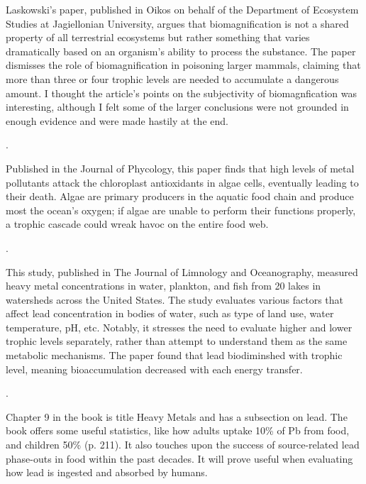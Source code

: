 \documentclass{article}
\begin{document}
Laskowski’s paper, published in Oikos on behalf of the Department of Ecosystem Studies at Jagiellonian University, argues that biomagnification is not a shared property of all terrestrial ecosystems but rather something that varies dramatically based on an organism’s ability to process the substance.  The paper dismisses the role of biomagnification in poisoning larger mammals, claiming that more than three or four trophic levels are needed to accumulate a dangerous amount. I thought the article’s points on the subjectivity of biomagnfication was interesting, although I felt some of the larger conclusions were not grounded in enough evidence and were made hastily at the end. 

.

\bigskip

Published in the Journal of Phycology, this paper finds that high levels of metal pollutants attack the chloroplast antioxidants in algae cells, eventually leading to their death. Algae are primary producers in the aquatic food chain and produce most the ocean’s oxygen; if algae are unable to perform their functions properly, a trophic cascade could wreak havoc on the entire food web.  

\bigskip

.

\bigskip

This study, published in The Journal of Limnology and Oceanography, measured heavy metal concentrations in water, plankton, and fish from 20 lakes in watersheds across the United States. The study evaluates various factors that affect lead concentration in bodies of water, such as type of land use, water temperature, pH, etc. Notably, it stresses the need to evaluate higher and lower trophic levels separately, rather than attempt to understand them as the same metabolic mechanisms. The paper found that lead biodiminshed with trophic level, meaning bioaccumulation decreased with each energy transfer. 

.

\bigskip

Chapter 9 in the book is title Heavy Metals and has a subsection on lead. The book offers some useful statistics, like how adults uptake 10\% of Pb from food, and children 50\% (p. 211). It also touches upon the success of source-related lead phase-outs in food within the past decades. It will prove useful when evaluating how lead is ingested and absorbed by humans. 
\end{document}
